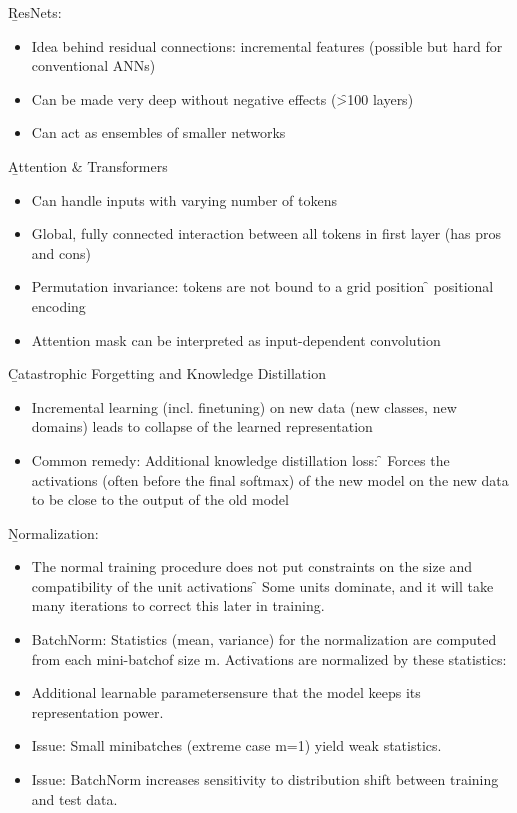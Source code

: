 \vspace{0.5em}
\b{ResNets:}
\begin{itemize}
    \item Idea behind residual connections: incremental features (possible but hard for conventional ANNs)
    \item Can be made very deep without negative effects (\f{>100} layers)
    \item Can act as ensembles of smaller networks
\end{itemize}
\vspace{2em}
\b{Attention \& Transformers}
\begin{itemize}
    \item Can handle inputs with varying number of tokens
    \item Global, fully connected interaction between all tokens in first layer (has pros and cons)
    \item Permutation invariance: tokens are not bound to a grid position \f{\to} positional encoding
    \item Attention mask can be interpreted as input-dependent convolution
\end{itemize}
\vspace{0.5em}
\b{Catastrophic Forgetting and Knowledge Distillation}
\begin{itemize}
    \item Incremental learning (incl. finetuning) on new data (new classes, new domains) leads to collapse of the learned representation
    \item Common remedy: Additional knowledge distillation loss:
    \f{\to} Forces the activations (often before the final softmax) of the new model on the new data to be close to the output of the old model
\end{itemize}
\vspace{0.5em}
\b{Normalization:}
\begin{itemize}
    \item The normal training procedure does not put constraints on the size and compatibility of the unit activations \f{\to} Some units dominate, and it will take many iterations to correct this later in training.
    \item BatchNorm: Statistics (mean, variance) for the normalization are computed from each mini-batchof size m. Activations are normalized by these statistics:
    \item Additional learnable parametersensure that the model keeps its representation power.
    \item Issue: Small minibatches (extreme case m=1) yield weak statistics.
    \item Issue: BatchNorm increases sensitivity to distribution shift between training and test data.
\end{itemize}

